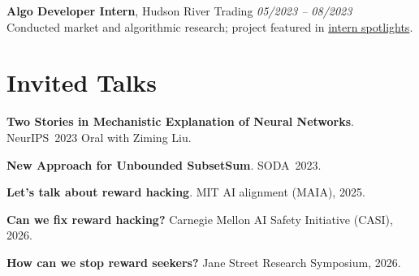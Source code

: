 \documentclass[11pt,letterpaper]{article}
\newcommand{\daterange}[3][]{%
  \hfill \textit{#2 -- #3} \vspace{1mm}
}
\begin{document}

\vspace{4pt}
\textbf{Algo Developer Intern}, Hudson River Trading \daterange[New York,~NY]{05/2023}{08/2023}\\
Conducted market and algorithmic research; project featured in \href{https://www.hudsonrivertrading.com/hrtbeat/intern-spotlight-2023-hrt-ai-labs-summer-projects/}{intern spotlights}.

\section*{Invited Talks}
\begin{outerlist}
\item \textbf{Two Stories in Mechanistic Explanation of Neural Networks}. NeurIPS~2023 Oral with Ziming Liu.
\item \textbf{New Approach for Unbounded SubsetSum}. SODA~2023.
\item \textbf{Let's talk about reward hacking}. MIT AI alignment (MAIA), 2025.
\item \textbf{Can we fix reward hacking?} Carnegie Mellon AI Safety Initiative (CASI), 2026.
\item \textbf{How can we stop reward seekers?} Jane Street Research Symposium, 2026.
\end{outerlist}

\end{document}
